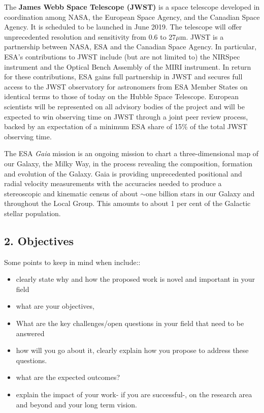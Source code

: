 \begin{framed}
The {\bf James Webb Space Telescope (JWST)} is a space telescope
developed in coordination among NASA, the European Space Agency, and
the Canadian Space Agency. It is scheduled to be launched in June
2019. The telescope will offer unprecedented resolution and
sensitivity from 0.6 to 27$\mu$m.
JWST is a partnership between NASA, ESA and the Canadian Space Agency.
In particular, ESA's contributions to JWST include (but are not
limited to) the NIRSpec instrument and the Optical Bench Assembly of
the MIRI instrument.  In return for these contributions, ESA gains
full partnership in JWST and secures full access to the JWST
observatory for astronomers from ESA Member States on identical terms
to those of today on the Hubble Space Telescope. European scientists
will be represented on all advisory bodies of the project and will be
expected to win observing time on JWST through a joint peer review
process, backed by an expectation of a minimum ESA share of 15\% of
the total JWST observing time.


The ESA {\it Gaia} mission is an ongoing mission to chart a
three-dimensional map of our Galaxy, the Milky Way, in the process
revealing the composition, formation and evolution of the Galaxy. Gaia
is providing unprecedented positional and radial velocity measurements
with the accuracies needed to produce a stereoscopic and kinematic
census of about $\sim$one billion stars in our Galaxy and throughout
the Local Group. This amounts to about 1 per cent of the Galactic
stellar population.
\end{framed}





\subsection*{2. Objectives}
\smallskip
\smallskip
\noindent
Some points to keep in mind when include::
\begin{itemize}
\item clearly state why and how the proposed work is novel and important in your field
\item what are your objectives,
\item What are the key challenges/open questions in your field that need to be answered 
\item how will you go about it, clearly explain how you propose to address these questions. 
\item what are the expected outcomes?
\item  explain the impact of your work- if you are successful-, on the research area and beyond and your long term vision.
\end{itemize}



